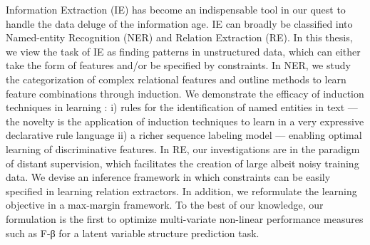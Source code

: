 Information Extraction (IE) has become an indispensable tool in our quest to handle the data deluge of the information age. IE can broadly be classified into Named-entity Recognition (NER) and Relation Extraction (RE). In this thesis, we view the task of IE as finding patterns in unstructured data, which can either take the form of features and/or be specified by constraints. In NER, we study the categorization of complex relational features and outline methods to learn feature combinations through induction. We demonstrate the efficacy of induction techniques in learning : i) rules for the identification of named entities in text --- the novelty is the application of induction techniques to learn in a very expressive declarative rule language ii) a richer sequence labeling model --- enabling optimal learning of discriminative features. In RE, our investigations are in the paradigm of distant supervision, which facilitates the creation of large albeit noisy training data. We devise an inference framework in which constraints can be easily specified in learning relation extractors. In addition, we reformulate the learning objective in a max-margin framework. To the best of our knowledge, our formulation is the first to optimize multi-variate non-linear performance measures such as F-β for a latent variable structure prediction task.
